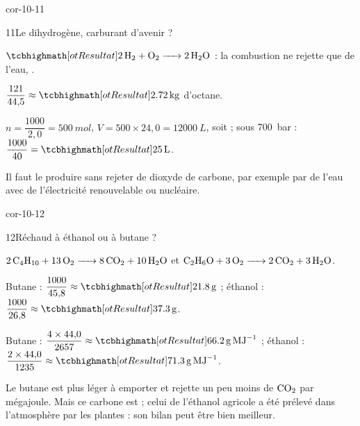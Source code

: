 \begin{blocLivre}{cor-10-11}
\begin{corrige}{11}{Le dihydrogène, carburant d'avenir ?}
\begin{questions}
\item $\res{\ce{2H2 + O2 -> 2H2O}}$ : la combustion ne rejette que de l'eau, .
\item $\dfrac{121}{44{,}5}\approx\res{\qty{2,72}{kg}}$ d'octane.
\item $n=\dfrac{1000}{2{,}0}=\qty{500}{mol}$, $V=500\times24{,}0=\qty{12000}{L}$, soit  ; sous \qty{700}{bar} : $\dfrac{1000}{40}=\res{\qty{25}{L}}$.
\item Il faut le produire sans rejeter de dioxyde de carbone, par exemple par  de l'eau avec de l'électricité
renouvelable ou nucléaire.
\end{questions}
\end{corrige}
\end{blocLivre}
\begin{blocLivre}{cor-10-12}
\begin{corrige}{12}{Réchaud à éthanol ou à butane ?}
\begin{questions}
\item $\ce{2C4H10 + 13O2 -> 8CO2 + 10H2O}$ et $\ce{C2H6O + 3O2 -> 2CO2 + 3H2O}$.
\item Butane : $\dfrac{1000}{45{,}8}\approx\res{\qty{21,8}{g}}$ ; éthanol : $\dfrac{1000}{26{,}8}\approx\res{\qty{37,3}{g}}$.
\item Butane : $\dfrac{4\times44{,}0}{2657}\approx\res{\qty{66,2}{g.MJ^{-1}}}$ ; éthanol : $\dfrac{2\times44{,}0}{1235}\approx\res{\qty{71,3}{g.MJ^{-1}}}$.
\item Le butane est plus léger à emporter et rejette un peu moins de $\ce{CO2}$ par mégajoule. Mais ce carbone est  ; celui
de l'éthanol agricole a été prélevé dans l'atmosphère par les plantes : son bilan peut être bien meilleur.
\end{questions}
\end{corrige}
\end{blocLivre}
